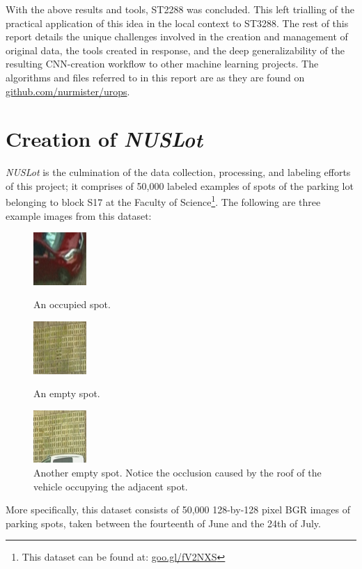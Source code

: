 \documentclass[a4paper, 11pt]{article} %
\begin{document}
	\newpage
	With the above results and tools, ST2288 was concluded. This left trialling of the practical 
	application of this idea in the local context to ST3288. The rest of this report details the unique 
	challenges involved in the creation and management of original data, the tools created in response, 
	and the deep generalizability of the resulting CNN-creation workflow to other machine learning 
	projects. The algorithms and files referred to in this report are as they are found on  
	\hyperlink{https://github.com/nurmister/urops}{github.com/nurmister/urops}.

\section{Creation of \textit{NUSLot}}
	\textit{NUSLot} is the culmination of the data collection, processing, and labeling efforts of this 
	project; it comprises of 50,000 labeled examples of spots of the parking lot belonging to block 
	S17 at the Faculty of Science\footnote{This dataset can be found at: 
	\hyperlink{https://goo.gl/fV2NXS}{goo.gl/fV2NXS}}. The following are three example images 
	from this dataset:
	\vskip 5mm
	\begin{figure}[h]
		\centering
		\includegraphics[width=2cm]{figures/nuslot_example_1.jpg}
		\caption{An occupied spot.}
		\vspace{5mm}
		\includegraphics[width=2cm]{figures/nuslot_example_2.jpg}
		\caption{An empty spot.}
		\vspace{5mm}
		\includegraphics[width=2cm]{figures/nuslot_example_3.jpg}
		\caption{Another empty spot. Notice the occlusion caused by the roof of the vehicle occupying 
		the adjacent spot.}
	\end{figure}
	\hspace*{-6mm}More specifically, this dataset consists of 50,000 128-by-128 pixel BGR images of 
	parking spots, taken between the fourteenth of June and the 24th of July. 
\end{document}
